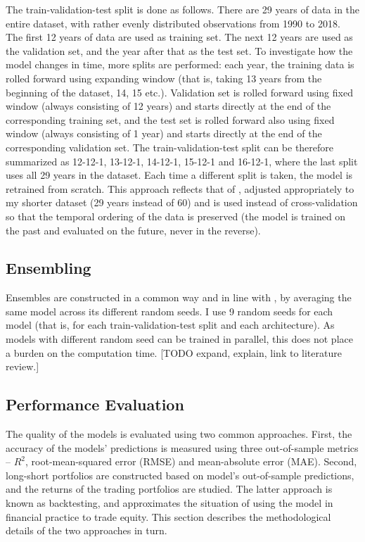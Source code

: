 		The train-validation-test split is done as follows. There are 29 years of data in the entire dataset, with rather evenly distributed observations from 1990 to 2018. The first 12 years of data are used as training set. The next 12 years are used as the validation set, and the year after that as the test set. To investigate how the model changes in time, more splits are performed: each year, the training data is rolled forward using expanding window (that is, taking 13 years from the beginning of the dataset, 14, 15 etc.). Validation set is rolled forward using fixed window (always consisting of 12 years) and starts directly at the end of the corresponding training set, and the test set is rolled forward also using fixed window (always consisting of 1 year) and starts directly at the end of the corresponding validation set. The train-validation-test split can be therefore summarized as 12-12-1, 13-12-1, 14-12-1, 15-12-1 and 16-12-1, where the last split uses all 29 years in the dataset. Each time a different split is taken, the model is retrained from scratch. This approach reflects that of \cite{gu2020empirical}, adjusted appropriately to my shorter dataset (29 years instead of 60) and is used instead of cross-validation so that the temporal ordering of the data is preserved (the model is trained on the past and evaluated on the future, never in the reverse).    
	
	\subsection{Ensembling}
		\label{chap:ensembling}
		Ensembles are constructed in a common way and in line with \cite{gu2020empirical}, by averaging the same model across its different random seeds. I use 9 random seeds for each model (that is, for each train-validation-test split and each architecture). As models with different random seed can be trained in parallel, this does not place a burden on the computation time. [TODO expand, explain, link to literature review.] 

	\subsection{Performance Evaluation}
		The quality of the models is evaluated using two common approaches. First, the accuracy of the models' predictions is measured using three out-of-sample metrics – $R^2$, root-mean-squared error (RMSE) and mean-absolute error (MAE). Second, long-short portfolios are constructed based on model's out-of-sample predictions, and the returns of the trading portfolios are studied. The latter approach is known as backtesting, and approximates the situation of using the model in financial practice to trade equity. This section describes the methodological details of the two approaches in turn. 
		
